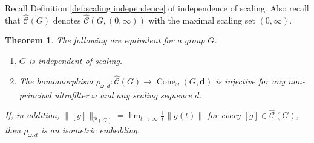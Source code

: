 \documentclass[12pt]{amsart}
\newtheorem{theorem}[prop]{Theorem}
\theoremstyle{definition}
\def\res{\operatorname{res}}
\newcommand{\B}[1]{\mathbf{#1}}
\newcommand{\OP}[1]{\operatorname{#1}}
\def\Cone{\OP{Cone}}
\def\tC{\hat{\mathcal{C}}}
\begin{document}
Recall Definition \ref{def:scaling independence} of independence of scaling. 
Also recall that $\tC(G)$ denotes $\tC(G,(0,\infty))$ with the maximal scaling set $(0,\infty)$.





\begin{theorem}\label{T:equivalence scaling independence and injective rho}
The following are equivalent for a group $G$.
\begin{enumerate}[label=(\alph*)]
\item\label{T:equivalence scaling independence and injective rho:scaling}
$G$ is independent of scaling.

\item\label{T:equivalence scaling independence and injective rho:injective}
The homomorphism $\rho_{\omega,d} \colon \tC(G) \to \Cone_{\omega}(G,\B d)$ is injective for any non-principal ultrafilter $\omega$ and any scaling sequence $d$.
\end{enumerate}
If, in addition, $\|[g]\|_{\tC(G)} = \lim_{t\to \infty} \tfrac{1}{t} \|g(t)\|$ for every $[g] \in \tC(G)$, then $\rho_{\omega,d}$ is an isometric embedding.
\end{theorem}
\end{document}
